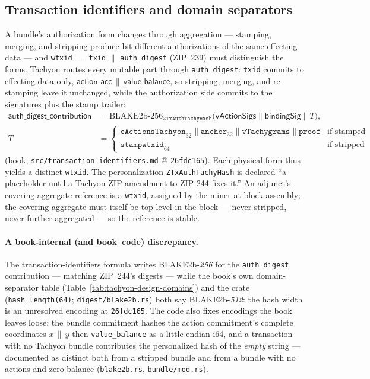 \documentclass[11pt,a4paper]{article}
\theoremstyle{definition}
\begin{document}
\subsection{Transaction identifiers and domain separators}
\label{sec:tachyon-design-txid}

A bundle's authorization form changes through aggregation --- stamping,
merging, and stripping produce bit-different authorizations of the same
effecting data --- and \texttt{wtxid} $=$ \texttt{txid} $\|$
\texttt{auth\_digest} (ZIP~239) must distinguish the forms. Tachyon routes
every mutable part through \texttt{auth\_digest}: \texttt{txid} commits to
effecting data only, $\mathsf{action\_acc} \,\|\, \mathsf{value\_balance}$,
so stripping, merging, and re-stamping leave it unchanged, while the
authorization side commits to the signatures plus the stamp trailer:
\[
\begin{split}
\mathsf{auth\_digest\_contribution} &=
\text{BLAKE2b-256}_{\texttt{ZTxAuthTachyHash}}\bigl(
  \mathsf{vActionSigs} \| \mathsf{bindingSig} \| T\bigr), \\
T &= \begin{cases}
    \texttt{cActionsTachyon}_{32} \| \texttt{anchor}_{32} \|
      \texttt{vTachygrams} \| \texttt{proof} & \text{if stamped} \\
    \texttt{stampWtxid}_{64} & \text{if stripped}
  \end{cases}
\end{split}
\]
(book, \texttt{src/transaction-identifiers.md} @ \texttt{26fdc165}). Each
physical form thus yields a distinct \texttt{wtxid}. The personalization
\texttt{ZTxAuthTachyHash} is declared ``a placeholder until a Tachyon-ZIP
amendment to ZIP-244 fixes it.'' An adjunct's covering-aggregate reference
is a \texttt{wtxid}, assigned by the miner at block assembly; the covering
aggregate must itself be top-level in the block --- never stripped, never
further aggregated --- so the reference is stable.

\paragraph{A book-internal (and book--code) discrepancy.} The
transaction-identifiers formula writes BLAKE2b-\emph{256} for the
\texttt{auth\_digest} contribution --- matching ZIP~244's digests ---
while the book's own domain-separator table
(Table~\ref{tab:tachyon-design-domains}) and the crate
(\texttt{hash\_length(64)}; \texttt{digest/blake2b.rs}) both say
BLAKE2b-\emph{512}: the hash width is an unresolved encoding at
\texttt{26fdc165}. The code also fixes encodings the book leaves loose:
the bundle commitment hashes the action commitment's complete coordinates
$x \,\|\, y$ then \texttt{value\_balance} as a little-endian i64, and a
transaction with no Tachyon bundle contributes the personalized hash of
the \emph{empty} string --- documented as distinct both from a stripped
bundle and from a bundle with no actions and zero balance
(\texttt{blake2b.rs}, \texttt{bundle/mod.rs}).
\end{document}
